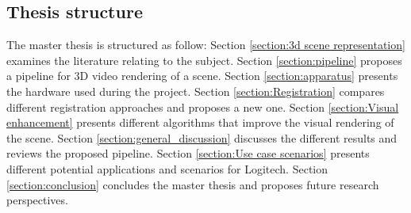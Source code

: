 \subsection{Thesis structure}
\label{section:thesis_structure}


The master thesis is structured as follow: Section \ref{section:3d scene representation} examines the literature relating to the subject. Section \ref{section:pipeline} proposes a pipeline for 3D video rendering of a scene. Section \ref{section:apparatus} presents the hardware used during the project. Section \ref{section:Registration} compares different registration approaches and proposes a new one. Section \ref{section:Visual enhancement} presents different algorithms that improve the visual rendering of the scene. Section \ref{section:general_discussion} discusses the different results and reviews the proposed pipeline. Section \ref{section:Use case scenarios} presents different potential applications and scenarios for Logitech. Section \ref{section:conclusion} concludes the master thesis and proposes future research perspectives.